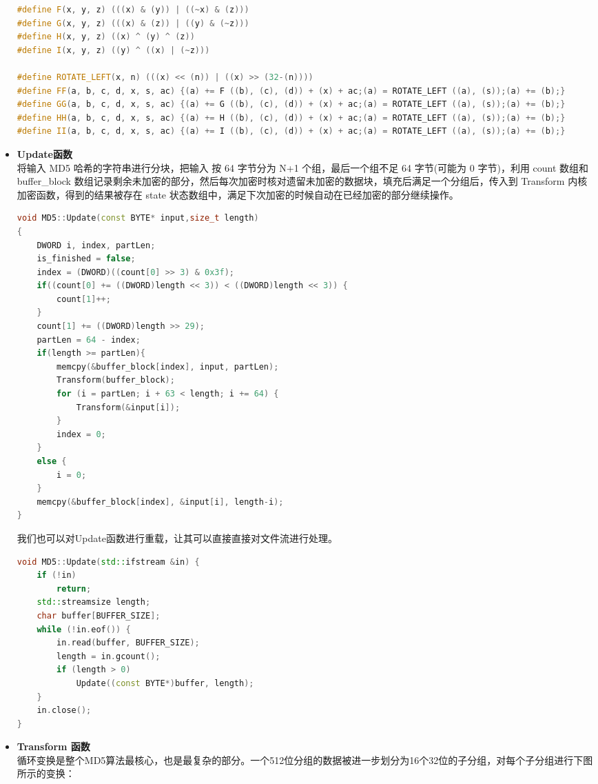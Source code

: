\documentclass[UTF8,a4paper,10pt]{ctexart}
\begin{document}
\begin{itemize}
\begin{lstlisting}[language = C++]
#define F(x, y, z) (((x) & (y)) | ((~x) & (z))) 
#define G(x, y, z) (((x) & (z)) | ((y) & (~z))) 
#define H(x, y, z) ((x) ^ (y) ^ (z)) 
#define I(x, y, z) ((y) ^ ((x) | (~z))) 

#define ROTATE_LEFT(x, n) (((x) << (n)) | ((x) >> (32-(n))))
#define FF(a, b, c, d, x, s, ac) {(a) += F ((b), (c), (d)) + (x) + ac;(a) = ROTATE_LEFT ((a), (s));(a) += (b);}
#define GG(a, b, c, d, x, s, ac) {(a) += G ((b), (c), (d)) + (x) + ac;(a) = ROTATE_LEFT ((a), (s));(a) += (b);}
#define HH(a, b, c, d, x, s, ac) {(a) += H ((b), (c), (d)) + (x) + ac;(a) = ROTATE_LEFT ((a), (s));(a) += (b);}
#define II(a, b, c, d, x, s, ac) {(a) += I ((b), (c), (d)) + (x) + ac;(a) = ROTATE_LEFT ((a), (s));(a) += (b);}
    \end{lstlisting}
    \item \textbf{Update函数}\\
    将输入 MD5 哈希的字符串进行分块，把输入 按 64 字节分为 N+1 个组，最后一个组不足 64 字节(可能为 0 字节)，利用 count 数组和 buffer\_block 数组记录剩余未加密的部分，然后每次加密时核对遗留未加密的数据块，填充后满足一个分组后，传入到 Transform 内核加密函数，得到的结果被存在 state 状态数组中，满足下次加密的时候自动在已经加密的部分继续操作。
    \begin{lstlisting}[language = C++]
void MD5::Update(const BYTE* input,size_t length)
{
    DWORD i, index, partLen;
    is_finished = false;
    index = (DWORD)((count[0] >> 3) & 0x3f);
    if((count[0] += ((DWORD)length << 3)) < ((DWORD)length << 3)) {
        count[1]++;
	}
    count[1] += ((DWORD)length >> 29);
    partLen = 64 - index;
    if(length >= partLen){
        memcpy(&buffer_block[index], input, partLen);
        Transform(buffer_block);
        for (i = partLen; i + 63 < length; i += 64) {
            Transform(&input[i]);
		}
        index = 0;
    } 
	else {
        i = 0;
    }
    memcpy(&buffer_block[index], &input[i], length-i);
}
    \end{lstlisting}
    我们也可以对Update函数进行重载，让其可以直接直接对文件流进行处理。
    \begin{lstlisting}[language = C++]
void MD5::Update(std::ifstream &in) {
	if (!in)
		return;
	std::streamsize length;
	char buffer[BUFFER_SIZE];
	while (!in.eof()) {
		in.read(buffer, BUFFER_SIZE);
		length = in.gcount();
		if (length > 0)
			Update((const BYTE*)buffer, length);
	}
	in.close();
}
    \end{lstlisting}
    \item \textbf{Transform 函数}\\ 
    循环变换是整个MD5算法最核心，也是最复杂的部分。一个512位分组的数据被进一步划分为16个32位的子分组，对每个子分组进行下图所示的变换：

\end{itemize}
\end{document}
